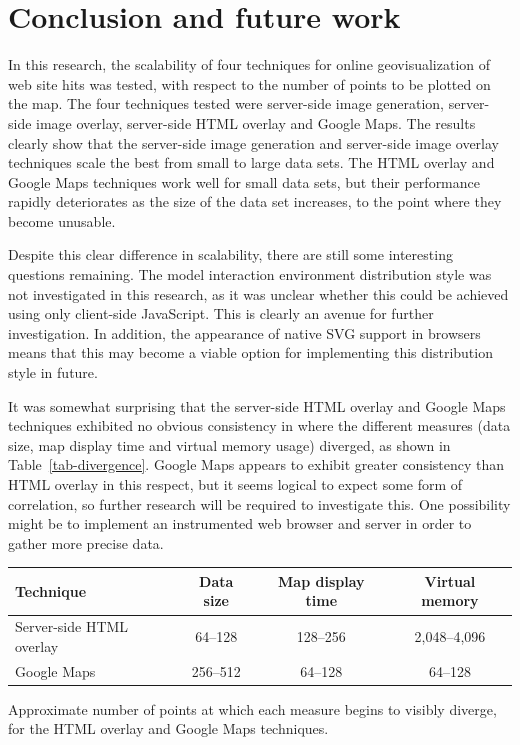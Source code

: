 \documentclass[acmnow]{acmtrans2m}
\begin{document}
\section{Conclusion and future work}
\label{sec-conclusion}

In this research, the scalability of four techniques for
online geovisualization of web site hits was tested, with respect to the number of
points to be plotted on the map. The four techniques tested were
server-side image generation, server-side image overlay, server-side
HTML overlay and Google Maps. The results clearly show that the
server-side image generation and server-side image overlay techniques
scale the best from small to large data sets. The HTML overlay and
Google Maps techniques work well for small data sets, but their
performance rapidly deteriorates as the size of the data set increases,
to the point where they become unusable.

Despite this clear difference in scalability, there are still some
interesting questions remaining. The model interaction environment
distribution style was not investigated in this research, as it was
unclear whether this could be achieved using only client-side
JavaScript. This is clearly an avenue for further investigation. In
addition, the appearance of native SVG support in browsers means that
this may become a viable option for implementing this distribution style
in future.

It was somewhat surprising that the server-side HTML overlay and Google
Maps techniques exhibited no obvious consistency in where the different
measures (data size, map display time and virtual memory usage)
diverged, as shown in Table~\ref{tab-divergence}. Google Maps appears to
exhibit greater consistency than HTML overlay in this respect, but it
seems logical to expect some form of correlation, so further research
will be required to investigate this. One possibility might be to
implement an instrumented web browser and server in order to gather more
precise data.


\begin{acmtable}{11cm}
	\centering
	\begin{tabular}{lccc}
		Technique						&	Data size	&	Map display time	&	Virtual memory	\\
		\hline
		Server-side HTML overlay		&	64--128		&	128--256			&	2,048--4,096 \\
		Google Maps						&	256--512	&	64--128				&	64--128	\\
	\end{tabular}
	\caption{Approximate number of points at which each measure begins to
		visibly diverge, for the HTML overlay and Google Maps techniques.}
	\label{tab-divergence}
\end{acmtable}
\end{document}
